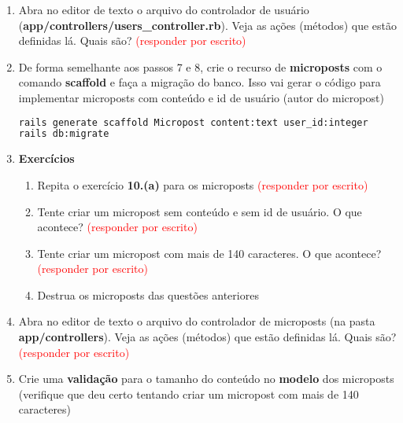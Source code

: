 \documentclass[a4paper,12pt]{article}
\begin{document}
\begin{enumerate}
  \item Abra no editor de texto o arquivo do controlador de usuário (\textbf{app/controllers/users\_controller.rb}). Veja as ações (métodos) que estão definidas lá. Quais são? \textcolor{red}{(responder por escrito)}


  \item De forma semelhante aos passos 7 e 8, crie o recurso de \textbf{microposts} com o comando \textbf{scaffold} e faça a migração do banco. Isso vai gerar o código para implementar microposts com conteúdo e id de usuário (autor do micropost)

    \begin{lstlisting}[language=Bash]
rails generate scaffold Micropost content:text user_id:integer
rails db:migrate
    \end{lstlisting}

  \item \textbf{Exercícios}

    \begin{enumerate}
      \item Repita o exercício \textbf{10.(a)} para os microposts \textcolor{red}{(responder por escrito)}
      \item Tente criar um micropost sem conteúdo e sem id de usuário. O que acontece? \textcolor{red}{(responder por escrito)}
      \item Tente criar um micropost com mais de 140 caracteres. O que acontece? \textcolor{red}{(responder por escrito)}
      \item Destrua os microposts das questões anteriores
    \end{enumerate}

  \item Abra no editor de texto o arquivo do controlador de microposts (na pasta \textbf{app/controllers}). Veja as ações (métodos) que estão definidas lá. Quais são? \textcolor{red}{(responder por escrito)}

  \item Crie uma \textbf{validação} para o tamanho do conteúdo no \textbf{modelo} dos microposts (verifique que deu certo tentando criar um micropost com mais de 140 caracteres)


\end{enumerate}
\end{document}
